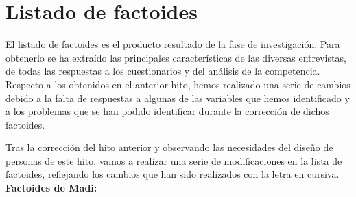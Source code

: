 \section{Listado de factoides}
El listado de factoides es el producto resultado de la fase de investigación. Para obtenerlo se ha extraído las principales características de las
diversas entrevistas, de todas las respuestas a los cuestionarios y del análisis de la competencia. Respecto a los obtenidos en el anterior hito,
hemos realizado una serie de cambios debido a la falta de respuestas a algunas de las variables que hemos identificado y a los problemas que se
han podido identificar durante la corrección de dichos factoides.


Tras la corrección del hito anterior y observando las necesidades del diseño de personas de este hito, vamos a realizar una serie de modificaciones
en la lista de factoides, reflejando los cambios que han sido realizados con la letra en cursiva. \\
\textbf{Factoides de Madi:}

